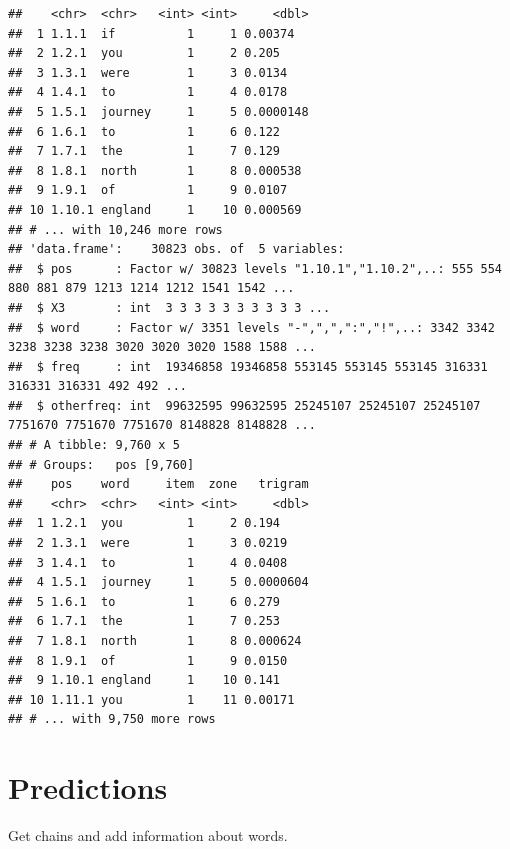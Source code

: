 \documentclass{article}\usepackage[]{graphicx}\usepackage[]{color}
\makeatletter
\newenvironment{kframe}{%
 \def\at@end@of@kframe{}%
 \ifinner\ifhmode%
  \def\at@end@of@kframe{\end{minipage}}%
  \begin{minipage}{\columnwidth}%
 \fi\fi%
 \def\FrameCommand##1{\hskip\@totalleftmargin \hskip-\fboxsep
 \colorbox{shadecolor}{##1}\hskip-\fboxsep
     \hskip-\linewidth \hskip-\@totalleftmargin \hskip\columnwidth}%
 \MakeFramed {\advance\hsize-\width
   \@totalleftmargin\z@ \linewidth\hsize
   \@setminipage}}%
 {\par\unskip\endMakeFramed%
 \at@end@of@kframe}
\newenvironment{knitrout}{}{} %
\makeatother
\begin{document}
\begin{knitrout}
\begin{kframe}
\begin{verbatim}
##    <chr>  <chr>   <int> <int>     <dbl>
##  1 1.1.1  if          1     1 0.00374  
##  2 1.2.1  you         1     2 0.205    
##  3 1.3.1  were        1     3 0.0134   
##  4 1.4.1  to          1     4 0.0178   
##  5 1.5.1  journey     1     5 0.0000148
##  6 1.6.1  to          1     6 0.122    
##  7 1.7.1  the         1     7 0.129    
##  8 1.8.1  north       1     8 0.000538 
##  9 1.9.1  of          1     9 0.0107   
## 10 1.10.1 england     1    10 0.000569 
## # ... with 10,246 more rows
## 'data.frame':	30823 obs. of  5 variables:
##  $ pos      : Factor w/ 30823 levels "1.10.1","1.10.2",..: 555 554 880 881 879 1213 1214 1212 1541 1542 ...
##  $ X3       : int  3 3 3 3 3 3 3 3 3 3 ...
##  $ word     : Factor w/ 3351 levels "-",",",":","!",..: 3342 3342 3238 3238 3238 3020 3020 3020 1588 1588 ...
##  $ freq     : int  19346858 19346858 553145 553145 553145 316331 316331 316331 492 492 ...
##  $ otherfreq: int  99632595 99632595 25245107 25245107 25245107 7751670 7751670 7751670 8148828 8148828 ...
## # A tibble: 9,760 x 5
## # Groups:   pos [9,760]
##    pos    word     item  zone   trigram
##    <chr>  <chr>   <int> <int>     <dbl>
##  1 1.2.1  you         1     2 0.194    
##  2 1.3.1  were        1     3 0.0219   
##  3 1.4.1  to          1     4 0.0408   
##  4 1.5.1  journey     1     5 0.0000604
##  5 1.6.1  to          1     6 0.279    
##  6 1.7.1  the         1     7 0.253    
##  7 1.8.1  north       1     8 0.000624 
##  8 1.9.1  of          1     9 0.0150   
##  9 1.10.1 england     1    10 0.141    
## 10 1.11.1 you         1    11 0.00171  
## # ... with 9,750 more rows
\end{verbatim}
\end{kframe}
\end{knitrout}


\section{Predictions}

Get chains and add information about words.
\end{document}
